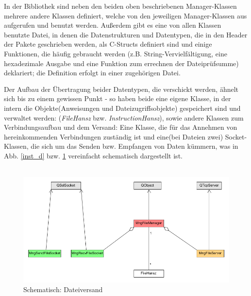 In der Bibliothek sind neben den beiden oben beschriebenen Manager-Klassen mehrere andere Klassen definiert, welche von den jeweiligen Manager-Klassen aus aufgerufen und benutzt werden.
Außerdem gibt es eine von allen Klassen benutzte Datei, in denen die Datenstrukturen und Datentypen, die in den Header der Pakete geschrieben werden, als C-Structs definiert sind und einige Funktionen, die häufig gebraucht werden (z.B. String-Vervielfältigung, eine hexadezimale Ausgabe und eine Funktion zum errechnen der Dateiprüfsumme) deklariert; die Definition erfolgt in einer zugehörigen Datei.\par
Der Aufbau der Übertragung beider Datentypen, die verschickt werden, ähnelt sich bis zu einem gewissen Punkt - so haben beide eine eigene Klasse, in der intern die Objekte(Anweisungen und Dateizugriffsobjekte) gespeichert sind und verwaltet werden: (\textit{FileHansz} bzw. \textit{InstructionHansz}), sowie andere Klassen zum Verbindungsaufbau und dem Versand: Eine Klasse, die für das Annehmen von hereinkommenden Verbindungen zuständig ist und eine(bei Dateien zwei) Socket-Klassen, die sich um das Senden bzw. Empfangen von Daten kümmern, was in Abb. \ref{inst_d} bzw. \ref{file_d} vereinfacht schematisch dargestellt ist.\\\\

\begin{figure}
\includegraphics[scale=.25]{classDiagFile}
\caption{Schematisch: Dateiversand}
\label{file_d}
\end{figure}

